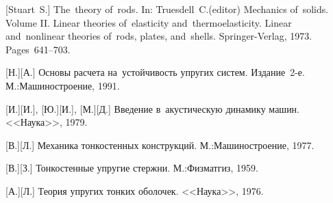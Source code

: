 \vspace*{10mm}


\newcommand\mirpublisher{<<Мир>>} %
\newcommand\naukapublisher{<<Наука>>} %
\newcommand\maschinenbaumoskauerverlag{М.:\;Машино\-строение}
\newcommand\maschinenbauleningraderverlag{Л.:\;Машино\-строение}
\newcommand\fizmatgiz{М.:\;Физ\-мат\-гиз} %

\begin{thebibliography}{123}
\small

\thispagestyle{empty}


\begin{otherlanguage}{russian}

[Stuart~S.] The~theory of~rods. In: Truesdell~C.\:(editor) Mechanics of~solids. Volume II. Linear theories of~elasticity and~thermoelasticity. Linear and~nonlinear theories of~rods, plates, and~shells. Springer\hbox{-}Verlag, 1973. Pages~641\hbox{--}703.

[Н.][А.] Основы расчета на~устойчивость упругих систем. Издание~2\hbox{-}е. \maschinenbaumoskauerverlag, 1991. 

[И.][И.], [Ю.][И.], [М.][Д.] Введение в~акустическую динамику машин. \naukapublisher, 1979. 

[В.][Л.]
Механика тонкостенных конструкций.
\maschinenbaumoskauerverlag,
1977.

[В.][З.] Тонкостенные упругие стержни. \fizmatgiz, 1959. 

[А.][Л.] Теория упругих тонких оболочек. \naukapublisher, 1976. 


\end{otherlanguage}
\end{thebibliography}
